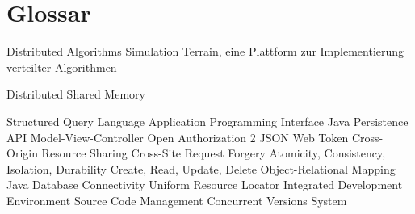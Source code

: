 \chapter{Glossar}

		{Distributed Algorithms Simulation Terrain, eine Plattform zur Implementierung verteilter Algorithmen}

			{Distributed Shared Memory}

			{Structured Query Language}
			{Application Programming Interface}
			{Java Persistence API}
			{Model-View-Controller}
		{Open Authorization 2}
			{JSON Web Token}
			{Cross-Origin Resource Sharing}
			{Cross-Site Request Forgery}
			{Atomicity, Consistency, Isolation, Durability}
			{Create, Read, Update, Delete}
			{Object-Relational Mapping}
		{Java Database Connectivity Uniform Resource Locator}
			{Integrated Development Environment}
	      {Source Code Management }
			{Concurrent Versions System}
